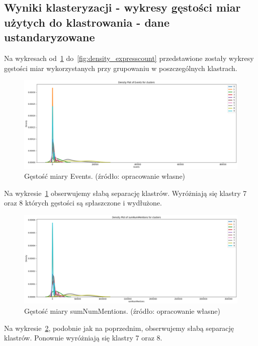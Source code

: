\documentclass[11pt]{report}
\begin{document}
    \subsection{Wyniki klasteryzacji - wykresy gęstości miar użytych do klastrowania - dane ustandaryzowane}
    Na wykresach od~\ref{fig:density_events} do~\ref{fig:density_expresscount} przedstawione zostały wykresy gęstości miar wykorzystanych przy grupowaniu w poszczególnych klastrach.

    \begin{figure}[!htp]
        \centering
        \includegraphics[width=\linewidth]{fig/CLUST/density_Events.png}
        \caption{Gęstość miary Events. (źródło: opracowanie własne)}
        \label{fig:density_events}
    \end{figure}

    Na wykresie~\ref{fig:density_events} obserwujemy słabą separację klastrów.
    Wyróżniają się klastry 7 oraz 8 których gęstości są spłaszczone i wydłużone.

    \begin{figure}[!htp]
        \centering
        \includegraphics[width=\linewidth]{fig/CLUST/density_sumNumMentions.png}
        \caption{Gęstość miary sumNumMentions. (źródło: opracowanie własne)}
        \label{fig:density_sumnummentions}
    \end{figure}

    Na wykresie~\ref{fig:density_sumnummentions}, podobnie jak na poprzednim, obserwujemy słabą separację klastrów.
    Ponownie wyróżniają się klastry 7 oraz 8.
\end{document}

